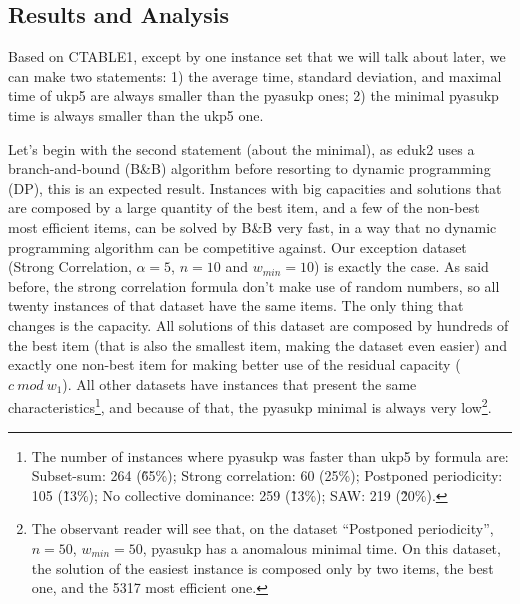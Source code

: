 \documentclass[runningheads,a4paper]{llncs}
\begin{document}
\subsection{Results and Analysis}

Based on CTABLE1, except by one instance set that we will talk about later, we can make two statements: 1) the average time, standard deviation, and maximal time of ukp5 are always smaller than the pyasukp ones; 2) the minimal pyasukp time is always smaller than the ukp5 one.

Let's begin with the second statement (about the minimal), as eduk2 uses a branch-and-bound (B\&B) algorithm before resorting to dynamic programming (DP), this is an expected result. Instances with big capacities and solutions that are composed by a large quantity of the best item, and a few of the non-best most efficient items, can be solved by B\&B very fast, in a way that no dynamic programming algorithm can be competitive against. Our exception dataset (Strong Correlation, \(\alpha = 5\), \(n = 10\) and \(w_{min} = 10\)) is exactly the case. As said before, the strong correlation formula don't make use of random numbers, so all twenty instances of that dataset have the same items. The only thing that changes is the capacity. All solutions of this dataset are composed by hundreds of the best item (that is also the smallest item, making the dataset even easier) and exactly one non-best item for making better use of the residual capacity (\(c~mod~w_1\)). All other datasets have instances that present the same characteristics\footnote{The number of instances where pyasukp was faster than ukp5 by formula are: Subset-sum: 264 (\~65\%); Strong correlation: 60 (25\%); Postponed periodicity: 105 (\~13\%); No collective dominance: 259 (\~13\%); SAW: 219 (\~20\%).}, and because of that, the pyasukp minimal is always very low\footnote{The observant reader will see that, on the dataset ``Postponed periodicity'', \(n = 50\), \(w_{min} = 50\), pyasukp has a anomalous minimal time. On this dataset, the solution of the easiest instance is composed only by two items, the best one, and the 5317 most efficient one.}.

\end{document}
